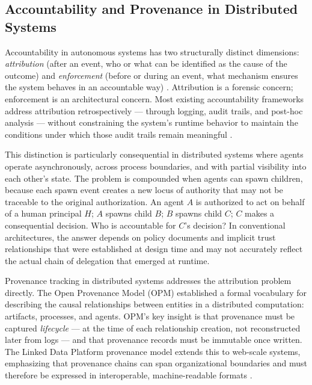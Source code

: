 \subsection{Accountability and Provenance in Distributed Systems}

Accountability in autonomous systems has two structurally distinct dimensions: \emph{attribution} (after an event, who or what can be identified as the cause of the outcome) and \emph{enforcement} (before or during an event, what mechanism ensures the system behaves in an accountable way) \cite{bansal2019}. Attribution is a forensic concern; enforcement is an architectural concern. Most existing accountability frameworks address attribution retrospectively --- through logging, audit trails, and post-hoc analysis --- without constraining the system's runtime behavior to maintain the conditions under which those audit trails remain meaningful \cite{ristenpart2009}.

This distinction is particularly consequential in distributed systems where agents operate asynchronously, across process boundaries, and with partial visibility into each other's state. The problem is compounded when agents can spawn children, because each spawn event creates a new locus of authority that may not be traceable to the original authorization. An agent $A$ is authorized to act on behalf of a human principal $H$; $A$ spawns child $B$; $B$ spawns child $C$; $C$ makes a consequential decision. Who is accountable for $C$'s decision? In conventional architectures, the answer depends on policy documents and implicit trust relationships that were established at design time and may not accurately reflect the actual chain of delegation that emerged at runtime.

Provenance tracking in distributed systems addresses the attribution problem directly. The Open Provenance Model (OPM) \cite{moreau2011} established a formal vocabulary for describing the causal relationships between entities in a distributed computation: artifacts, processes, and agents. OPM's key insight is that provenance must be captured \emph{lifecycle} --- at the time of each relationship creation, not reconstructed later from logs --- and that provenance records must be immutable once written. The Linked Data Platform provenance model extends this to web-scale systems, emphasizing that provenance chains can span organizational boundaries and must therefore be expressed in interoperable, machine-readable formats \cite{nyberg2012}.

